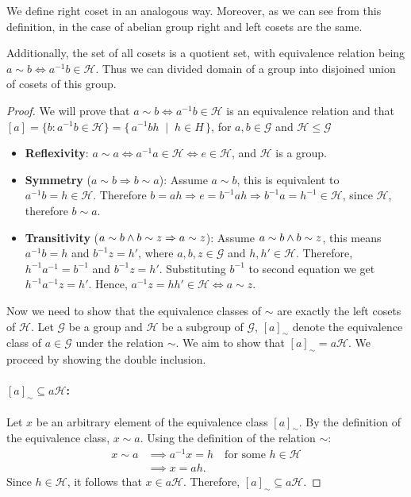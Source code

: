 \documentclass{pracalicmgr2025}
\theoremstyle{plain}            %
\theoremstyle{remark}           %
\theoremstyle{definition}       %
\begin{document}
We define right coset in an analogous way. Moreover, as we can see from this definition, in the case of abelian group right and left cosets are the same.

Additionally, the set of all cosets is a quotient set, with equivalence relation being $a\sim b \iff a^{-1}b\in \mathcal{H}$. Thus we can divided domain of a group into disjoined union of cosets of this group. 
\begin{proof}
We will prove that $a\sim b \iff a^{-1}b\in \mathcal{H}$ is an equivalence relation and that $[a] = \{b:a^{-1}b \in \mathcal{H} \} = \{ \, a^{-1}bh \;\mid\; h \in H \,\}$, for $a,b \in \mathcal{G}$ and $\mathcal{H}\le \mathcal{G}$
    \begin{itemize}
        \item \textbf{Reflexivity}: $a\sim a \iff a^{-1}a\in \mathcal{H} \iff e \in \mathcal{H}$, and $\mathcal{H}$ is a group.
        \item \textbf{Symmetry} ($a\sim b \Rightarrow b \sim a$): Assume $a\sim b$, this is equivalent to  $a^{-1}b = h \in \mathcal{H}$. Therefore $b = ah \Rightarrow e = b^{-1}ah \Rightarrow b^{-1}a = h^{-1} \in \mathcal{H}$, since $\mathcal{H}$, therefore $b\sim a$.
        \item \textbf{Transitivity} ($a\sim b \space \land \space b \sim z  \Rightarrow a \sim z$): Assume $a\sim b \space \land \space b \sim z$, this means $a^{-1}b = h$ and $b^{-1}z = h'$, where $a,b,z \in \mathcal{G}$ and $h,h' \in \mathcal{H}$. Therefore, $h^{-1}a^{-1} = b^{-1}$ and $b^{-1}z = h'$. Substituting $b^{-1}$ to second equation we get $h^{-1}a^{-1}z = h'$. Hence, $a^{-1}z = hh'\in \mathcal{H} \iff a \sim z$. 
    \end{itemize}
Now we need to show that the equivalence classes of $\sim$ are exactly the left cosets of $\mathcal{H}$. Let $\mathcal{G}$ be a group and $\mathcal{H}$ be a subgroup of $\mathcal{G}$, $[a]_\sim$ denote the equivalence class of $a \in \mathcal{G}$ under the relation $\sim$. We aim to show that $[a]_\sim = a\mathcal{H}$. We proceed by showing the double inclusion.



\paragraph{ $[a]_\sim \subseteq a\mathcal{H}$:}

Let $x$ be an arbitrary element of the equivalence class $[a]_\sim$. By the definition of the equivalence class, $x \sim a$.
Using the definition of the relation $\sim$:
\begin{align*}
    x \sim a &\implies a^{-1}x = h \quad \text{for some } h \in \mathcal{H} \\
             &\implies x = ah.
\end{align*}
Since $h \in \mathcal{H}$, it follows that $x \in a\mathcal{H}$.
Therefore, $[a]_\sim \subseteq a\mathcal{H}$.


\end{proof}
\end{document}
